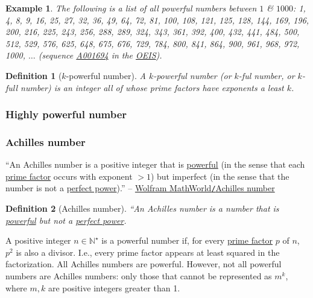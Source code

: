 \documentclass{article}
\newtheorem{definition}{Definition}
\newtheorem{example}{Example}
\begin{document}
\begin{example}
	The following is a list of all powerful numbers between $1$ \& $1000$: \emph{1, 4, 8, 9, 16, 25, 27, 32, 36, 49, 64, 72, 81, 100, 108, 121, 125, 128, 144, 169, 196, 200, 216, 225, 243, 256, 288, 289, 324, 343, 361, 392, 400, 432, 441, 484, 500, 512, 529, 576, 625, 648, 675, 676, 729, 784, 800, 841, 864, 900, 961, 968, 972, 1000}, $\ldots$ (sequence \href{https://oeis.org/A001694}{A001694} in the \href{https://en.wikipedia.org/wiki/On-Line_Encyclopedia_of_Integer_Sequences}{OEIS}).
\end{example}

\begin{definition}[$k$-powerful number]
	A \emph{$k$-powerful number} (or \emph{$k$-ful number}, or \emph{$k$-full number}) is an integer all of whose prime factors have exponents a least $k$.
\end{definition}

\subsubsection{Highly powerful number}

\subsubsection{Achilles number}
``An Achilles number is a positive integer that is \href{https://mathworld.wolfram.com/PowerfulNumber.html}{powerful} (in the sense that each \href{https://mathworld.wolfram.com/PrimeFactor.html}{prime factor} occurs with exponent $> 1$) but imperfect (in the sense that the number is not a \href{https://mathworld.wolfram.com/PerfectPower.html}{perfect power}).'' -- \href{https://mathworld.wolfram.com/AchillesNumber.html}{Wolfram MathWorld{\tt /}Achilles number}

\begin{definition}[Achilles number]
	``An \emph{Achilles number} is a number that is \href{https://en.wikipedia.org/wiki/Powerful_number}{powerful} but not a \href{https://en.wikipedia.org/wiki/Perfect_power}{perfect power}.
\end{definition}
A positive integer $n\in\mathbb{N}^\star$ is a powerful number if, for every \href{https://en.wikipedia.org/wiki/Prime_factor}{prime factor} $p$ of $n$, $p^2$ is also a divisor. I.e., every prime factor appears at least squared in the factorization. All Achilles numbers are powerful. However, not all powerful numbers are Achilles numbers: only those that cannot be represented as $m^k$, where $m,k$ are positive integers greater than 1.
\end{document}
